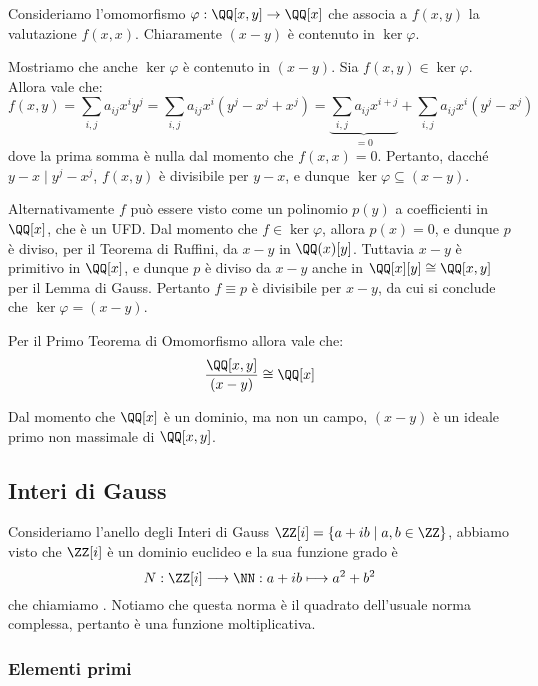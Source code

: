 \documentclass[11pt]{scrartcl}
\begin{document}
	\begin{remark}
		Consideriamo l'omomorfismo $\varphi : \QQ[x, y] \to \QQ[x]$ che
		associa a $f(x, y)$ la valutazione $f(x, x)$. Chiaramente
		$(x - y)$ è contenuto in $\ker \varphi$. \medskip


		Mostriamo che anche
		$\ker \varphi$ è contenuto in $(x - y)$. Sia $f(x, y) \in \ker \varphi$.
		Allora vale che:
		\[ f(x, y) = \sum_{i,j} a_{ij} x^i y^j = \sum_{i,j} a_{ij} x^i (y^j - x^j + x^j) = \underbrace{\sum_{i,j} a_{ij} x^{i+j}}_{=0} + \sum_{i,j} a_{ij} x^i (y^j - x^j) \]
		dove la prima somma è nulla dal momento che $f(x, x) = 0$. Pertanto,
		dacché $y-x \mid y^j - x^j$, $f(x, y)$ è divisibile per $y-x$, e dunque
		$\ker \varphi \subseteq (x-y)$. \medskip


		Alternativamente $f$ può essere visto come un polinomio $p(y)$ a coefficienti in
		$\QQ[x]$, che è un UFD. Dal momento che $f \in \ker \varphi$, allora $p(x) = 0$, e
		dunque $p$ è diviso, per il Teorema di Ruffini, da $x - y$ in
		$\QQ(x)[y]$. Tuttavia $x - y$ è primitivo in $\QQ[x]$, e dunque
		$p$ è diviso da $x - y$ anche in $\QQ[x][y] \cong \QQ[x, y]$ per il
		Lemma di Gauss. Pertanto $f \equiv p$ è divisibile per $x - y$,
		da cui si conclude che $\ker \varphi = (x - y)$. \medskip
		
		
		Per il Primo Teorema di Omomorfismo allora vale che:
		\[ \frac{\QQ[x, y]}{(x - y)} \cong \QQ[x] \]
		
		
		Dal momento che $\QQ[x]$ è un dominio, ma non un campo,
		$(x-y)$ è un ideale primo non massimale di $\QQ[x, y]$.
	\end{remark}
	
	\newpage
	
	\subsection{Interi di Gauss}
	
	Consideriamo l'anello degli Interi di Gauss $\ZZ[i] = \{a + ib\mid a, b \in \ZZ\}$,
	abbiamo visto che $\ZZ[i]$ è un dominio euclideo e la sua funzione grado è
	\[
	N: \ZZ[i]\longrightarrow \NN: a + ib \longmapsto a^2 + b^2
	\]
	che chiamiamo . Notiamo che questa norma è il quadrato dell'usuale 
	norma complessa, pertanto è una funzione moltiplicativa. 
	
	\subsubsection{Elementi primi}
	
\end{document}
